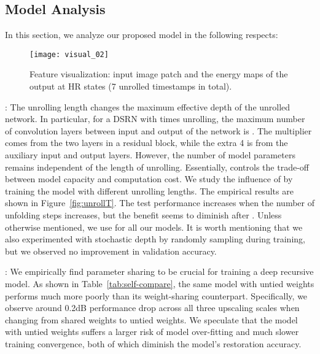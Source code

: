 \documentclass[10pt,twocolumn,letterpaper]{article}
\newcommand{\algname}{DSRN }
\begin{document}
\subsection{Model Analysis}
In this section, we analyze our proposed model in the following respects:  

\begin{figure*}[tb]
\begin{centering}
\texttt{[image: visual\_02]}
\par\end{centering}
\caption{Feature visualization: input image patch and the energy maps of the output at HR states (7 unrolled timestamps in total). }
\label{fig:vis}
\end{figure*}

: The unrolling length  changes the maximum effective depth of the unrolled network.  In particular, for a \algname with  times unrolling, the maximum number of convolution layers between input and output of the network is  .  
The multiplier  comes from the two layers in a residual block, while the extra 4 is from the auxiliary input and output layers.
However,  the number of model parameters remains independent of the length of unrolling.   Essentially,  controls the trade-off between model capacity and computation cost. We study the influence of  by training the model with different unrolling lengths.   The empirical results are shown in Figure~\ref{fig:unrollT}.  The test performance increases when the number of unfolding steps increases, but the benefit seems to diminish after .  Unless otherwise mentioned, we use  for all our models.  It is worth mentioning that we also experimented with stochastic depth \cite{huang2016deep} by randomly sampling  during training, but we observed no improvement in validation accuracy.

:   We empirically find parameter sharing to be crucial for training a deep recursive model.  As shown in Table~\ref{tab:self-compare}, the same model with untied weights performs much more poorly than its weight-sharing counterpart.  
Specifically, we observe around 0.2dB performance drop across all three upscaling scales when changing from shared weights to untied weights.
We speculate that the model with untied weights suffers a larger risk of model over-fitting and much slower training convergence, both of which diminish the model's restoration accuracy.
\end{document}
